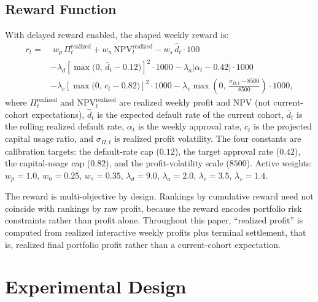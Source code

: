 \documentclass[preprint,review,authoryear,12pt]{elsarticle}
\begin{document}
\subsection{Reward Function}
\label{sec:reward}

With delayed reward enabled, the shaped weekly reward is:
\begin{equation}
    \label{eq:reward}
    \begin{aligned}
        r_t ={} & \;
        w_p\,\Pi^{\text{realized}}_t
        + w_n\,\mathrm{NPV}^{\text{realized}}_t
        - w_s\,\hat{d}_t \cdot 100                                                                   \\
                & - \lambda_d\!\left[\max\!\bigl(0,\,\bar{d}_t - 0.12\bigr)\right]^{\!2}\!\cdot 1000
        - \lambda_a\left|\alpha_t - 0.42\right|\cdot 1000                                            \\
                & - \lambda_c\!\left[\max\!\bigl(0,\,c_t - 0.82\bigr)\right]^{\!2}\!\cdot 1000
        - \lambda_v\max\!\!\left(0,\,\frac{\sigma_{\Pi,t}-8500}{8500}\right)\!\cdot 1000,
    \end{aligned}
\end{equation}
where $\Pi^{\text{realized}}_t$ and $\mathrm{NPV}^{\text{realized}}_t$ are realized
weekly profit and NPV (not current-cohort expectations), $\hat{d}_t$ is the expected
default rate of the current cohort, $\bar{d}_t$ is the rolling realized default rate,
$\alpha_t$ is the weekly approval rate, $c_t$ is the projected capital usage ratio, and
$\sigma_{\Pi,t}$ is realized profit volatility. The four constants are calibration
targets: the default-rate cap ($0.12$), the target approval rate ($0.42$), the
capital-usage cap ($0.82$), and the profit-volatility scale ($8500$). Active weights:
$w_p{=}1.0$, $w_n{=}0.25$, $w_s{=}0.35$, $\lambda_d{=}9.0$, $\lambda_a{=}2.0$,
$\lambda_c{=}3.5$, $\lambda_v{=}1.4$.

The reward is multi-objective by design. Rankings by cumulative reward need not coincide
with rankings by raw profit, because the reward encodes portfolio risk constraints
rather than profit alone. Throughout this paper, ``realized profit'' is computed from
realized interactive weekly profits plus terminal settlement, that is, realized final
portfolio profit rather than a current-cohort expectation.

\section{Experimental Design}
\end{document}
